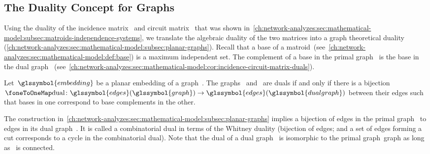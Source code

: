 \subsection{The Duality Concept for Graphs}
\label{ch:network-analyzes:sec:duality-concept}
% 
Using the duality of the incidence matrix~ and
circuit matrix~ that was shown
in~\cref{ch:network-analyzes:sec:mathematical-model:subsec:matroids-independence-systems},
we translate the algebraic duality of the two matrices into a graph theoretical
duality
(\cref{ch:network-analyzes:sec:mathematical-model:subsec:planar-graphs}). Recall
that a base of a
matroid~(see~\cref{ch:network-analyzes:sec:mathematical-model:def:base}) is a
maximum independent set. The complement of a base in the primal
graph~ is the base in the dual graph~
(see~\cref{ch:network-analyzes:sec:mathematical-model:cor:incidence-circuit-matrix-duals}).
% 
\begin{theorem}
    Let~$\glssymbol{embedding}$ be a planar embedding of a
    graph~. The graphs~
    and~ are duals if and only if there is a bijection~$
        \oneToOneMap
        \colon
        \glssymbol{edges}(\glssymbol{graph}) 
        \to
        \glssymbol{edges}(\glssymbol{dualgraph})
    $ between their edges such that bases in one correspond to base complements
    in the other.
    \label{ch:network-analyzes:sec:mathematical-model:thm:Matroids-one-to-one-corrspondence}
\end{theorem}
% 
The construction
in~\cref{ch:network-analyzes:sec:mathematical-model:subsec:planar-graphs}
implies a bijection of edges in the primal graph~ to edges in
its dual graph~.
% 
It is called a combinatorial dual in terms of the Whitney duality (bijection of
edges; and a set of edges forming a cut corresponds to a cycle
in the combinatorial dual). Note that the dual of a dual
graph~ is isomorphic to the primal graph~\gls{graph} as
long as~ is connected.

